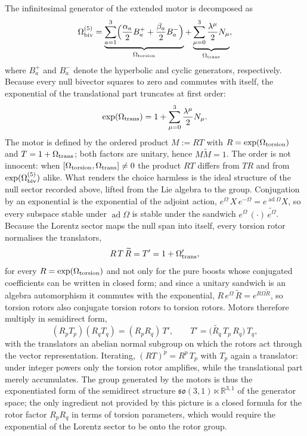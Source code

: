 \documentclass[a4paper]{article}
\theoremstyle{definition}
\theoremstyle{remark}
\begin{document}
The infinitesimal generator of the extended motor is decomposed as
\[
\Omega_{\rm biv}^{(5)} = \underbrace{\sum_{a=1}^3 \Bigl( \frac{\alpha_a}{2} B_a^+ + \frac{\beta_a}{2} B_a^- \Bigr)}_{\Omega_{\rm torsion}} + \underbrace{\sum_{\mu=0}^3 \frac{\lambda^\mu}{2} N_\mu}_{\Omega_{\rm trans}},
\]
where \( B_a^+ \) and \( B_a^- \) denote the hyperbolic and cyclic generators, respectively. Because every null bivector squares to zero and commutes with itself, the exponential of the translational part truncates at first order:
\[
\exp(\Omega_{\rm trans}) = 1 + \sum_{\mu=0}^3 \frac{\lambda^\mu}{2} N_\mu.
\]
The motor is defined by the ordered product \( M := RT \) with \( R=\exp(\Omega_{\rm torsion}) \) and \( T=1+\Omega_{\rm trans} \); both factors are unitary, hence \( M\widetilde{M}=1 \). The order is not innocent: when \([\Omega_{\rm torsion},\Omega_{\rm trans}]\neq 0\) the product \( RT \) differs from \( TR \) and from \( \exp(\Omega_{\rm biv}^{(5)}) \) alike. What renders the choice harmless is the ideal structure of the null sector recorded above, lifted from the Lie algebra to the group. Conjugation by an exponential is the exponential of the adjoint action, \( e^{\Omega}\,X\,e^{-\Omega} = e^{\operatorname{ad}\Omega}X \), so every subspace stable under \( \operatorname{ad}\Omega \) is stable under the sandwich \( e^{\Omega}\,(\cdot)\,\widetilde{e^{\Omega}} \). Because the Lorentz sector maps the null span into itself, every torsion rotor normalises the translators,
\[
R\,T\,\widetilde{R} = T' = 1+\Omega'_{\rm trans},
\]
for every \( R=\exp(\Omega_{\rm torsion}) \) and not only for the pure boosts whose conjugated coefficients can be written in closed form; and since a unitary sandwich is an algebra automorphism it commutes with the exponential, \( R\,e^{\Omega}\,\widetilde R = e^{R\Omega\widetilde R} \), so torsion rotors also conjugate torsion rotors to torsion rotors. Motors therefore multiply in semidirect form,
\[
(R_pT_p)(R_qT_q) = (R_pR_q)\,T', \qquad T' = \bigl(\widetilde{R_q}\,T_p\,R_q\bigr)\,T_q,
\]
with the translators an abelian normal subgroup on which the rotors act through the vector representation. Iterating, \( (RT)^p = R^p\,T_p \) with \( T_p \) again a translator: under integer powers only the torsion rotor amplifies, while the translational part merely accumulates. The group generated by the motors is thus the exponentiated form of the semidirect structure \( \mathfrak{so}(3,1)\ltimes\mathbb{R}^{3,1} \) of the generator space; the only ingredient not provided by this picture is a closed formula for the rotor factor \( R_pR_q \) in terms of torsion parameters, which would require the exponential of the Lorentz sector to be onto the rotor group.
\end{document}
